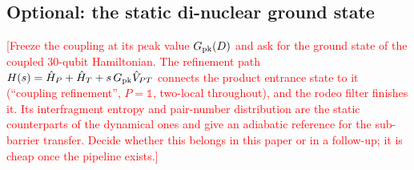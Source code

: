 \documentclass[
  aps,
  prc,
  reprint,
  superscriptaddress,
  floatfix,
  nofootinbib
]{revtex4-2}
\newcommand{\todo}[1]{\textcolor{red}{[#1]}}
\newcommand{\HP}{\hat H_{P}}
\newcommand{\HT}{\hat H_{T}}
\begin{document}
\subsection{Optional: the static di-nuclear ground state}
\label{sec:static}
\todo{Freeze the coupling at its peak value $G_{\rm pk}(D)$ and ask for the
ground state of the coupled 30-qubit Hamiltonian.  The refinement path
$H(s)=\HP+\HT+s\,G_{\rm pk}\hat V_{PT}$ connects the product entrance state to
it (``coupling refinement'', $P=\mathbb 1$, two-local throughout), and the
rodeo filter finishes it.  Its interfragment entropy and pair-number
distribution are the static counterparts of the dynamical ones and give an
adiabatic reference for the sub-barrier transfer.  Decide whether this
belongs in this paper or in a follow-up; it is cheap once the pipeline
exists.}

\end{document}
